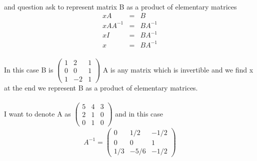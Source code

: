 \documentclass[11pt]{article}
\begin{document}
\paragraph{}and question ask to represent matrix B as a product of elementary matrices
\begin{eqnarray*}
xA&=&B
\\xAA^{-1}&=&BA^{-1}
\\xI&=&BA^{-1}
\\x&=&BA^{-1}
\end{eqnarray*}
\paragraph{}In this case B is 
$
\begin{pmatrix}
1 & 2 & 1\\
0 & 0 & 1\\
1 & -2 & 1
\end{pmatrix}
$
A is any matrix which is invertible and we find x at the end we represent B as a product of elementary matrices.
\paragraph{}I want to denote A as 
$
\begin{pmatrix}
5 & 4 & 3\\
2 & 1 & 0\\
0 & 1 & 0
\end{pmatrix}
$ and in this case 
\begin{eqnarray*}
A^{-1}=
\begin{pmatrix}
0 & 1/2 & -1/2\\
0 & 0 & 1\\
1/3 & -5/6 & -1/2
\end{pmatrix}
\end{eqnarray*}
\end{document}
